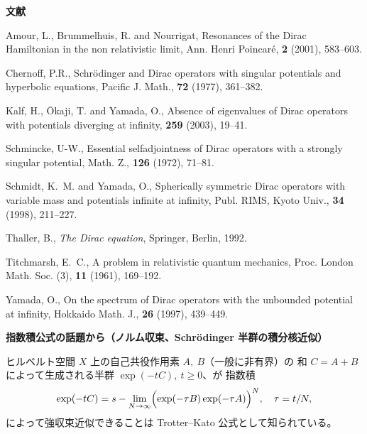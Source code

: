 \documentclass[uplatex,dvipdfmx]{jlreq}
\renewcommand{\t}{\tau}
\begin{document}
\begin{center}\textbf{文献}\end{center}
\noindent [1] Amour, L., Brummelhuis, R. and Nourrigat,
Resonances of the Dirac Hamiltonian in the non relativistic limit, Ann.
Henri Poincaré,
\textbf{2} (2001), 583--603.

\noindent [2] Chernoff, P.R., Schr\"{o}dinger and Dirac operators with
singular potentials and hyperbolic equations, Pacific J. Math., \textbf{72}
(1977), 361--382.

\noindent [3] Kalf, H., \={O}kaji, T. and Yamada, O.,
Absence of eigenvalues of Dirac operators with potentials diverging at
infinity, \textbf{259} (2003), 19--41.

\noindent [4] Schmincke, U-W., Essential selfadjointness of Dirac operators
with a strongly singular potential, Math. Z., \textbf{126} (1972), 71--81.

\noindent [5] Schmidt, K.~M. and Yamada, O., Spherically symmetric Dirac
operators with variable mass and potentials infinite at infinity, Publ.
RIMS, Kyoto Univ., \textbf{34} (1998), 211--227.

\noindent [6] Thaller, B., \textit{The Dirac equation}, Springer, Berlin, 1992.

\noindent [7] Titchmarsh, E.~C., A problem in relativistic quantum mechanics,
Proc. London Math. Soc. (3), \textbf{11} (1961), 169--192.

\noindent [8] Yamada, O., On the spectrum of Dirac operators with the
unbounded potential at infinity, Hokkaido Math. J., \textbf{26} (1997),
439--449.

\newpage

\begin{center}
{\large\bfseries 指数積公式の話題から（ノルム収束、Schr\"odinger 半群の積分核近似）}\\[6pt]
\hspace*{\fill}{\large\bfseries 田村　英男（岡山大・理）}
\end{center}

ヒルベルト空間 $X$ 上の自己共役作用素 $A,~B$（一般に非有界）の
和 $C = A + B$ によって生成される半群 $\exp(-tC),~t \geq 0$、が
指数積
\[
\exp(-tC) =
s-\lim_{N \to \infty}
\Bigl(\exp(-\t B)\exp(-\t A)\Bigr)^N,
\quad \t = t/N,
\]
によって強収束近似できることは Trotter--Kato 公式として知られている。
\end{document}
